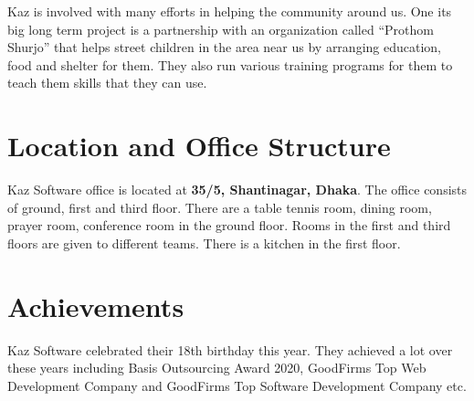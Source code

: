 Kaz is involved with many efforts in helping the community around us.
One its big long term project is a partnership with an organization called “Prothom Shurjo” that helps street children in the area near us by arranging education, food and shelter for them.
They also run various training programs for them to teach them skills that they can use.

\section{Location and Office Structure}

Kaz Software office is located at \textbf{35/5, Shantinagar, Dhaka}.
The office consists of ground, first and third floor.
There are a table tennis room, dining room, prayer room, conference room in the ground floor.
Rooms in the first and third floors are given to different teams.
There is a kitchen in the first floor.

\section{Achievements}

Kaz Software celebrated their 18th birthday this year.
They achieved a lot over these years including Basis Outsourcing Award 2020, GoodFirms Top Web Development Company and GoodFirms Top Software Development Company etc.